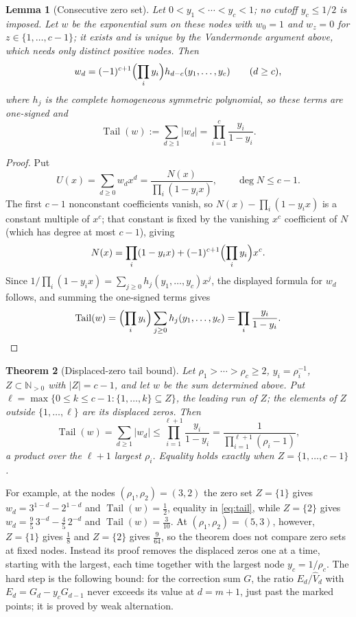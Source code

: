 \documentclass[11pt]{article}
\newtheorem{theorem}{Theorem}[section]
\newtheorem{lemma}[theorem]{Lemma}
\newcommand{\N}{\mathbb N}
\DeclareMathOperator{\Tail}{Tail}
\begin{document}
\begin{lemma}[Consecutive zero set]\label{lem:consecutive}
Let $0<y_1<\cdots<y_c<1$; no cutoff $y_c\le1/2$ is imposed.  Let $w$ be the
exponential sum on these nodes with $w_0=1$ and $w_z=0$ for $z\in\{1,\ldots,c-1\}$;
it exists and is unique by the Vandermonde argument above, which needs only
distinct positive nodes.  Then
\[
  w_d=(-1)^{c+1}\Bigl(\prod_iy_i\Bigr)h_{d-c}(y_1,\ldots,y_c)
  \qquad(d\ge c),
\]
where $h_j$ is the complete homogeneous symmetric polynomial, so these terms
are one-signed and
\[
  \Tail(w):=\sum_{d\ge1}|w_d|=\prod_{i=1}^c\frac{y_i}{1-y_i}.
\]
\end{lemma}

\begin{proof}
Put
\[
  U(x)=\sum_{d\ge0}w_dx^d=\frac{N(x)}{\prod_i(1-y_ix)},
  \qquad \deg N\le c-1.
\]
The first $c-1$ nonconstant coefficients vanish, so $N(x)-\prod_i(1-y_ix)$
is a constant multiple of $x^c$; that constant is fixed by the vanishing
$x^c$ coefficient of $N$ (which has degree at most $c-1$), giving
\[
  N(x)=\prod_i(1-y_ix)+(-1)^{c+1}\Bigl(\prod_i y_i\Bigr)x^c .
\]
Since $1/\prod_i(1-y_ix)=\sum_{j\ge0}h_j(y_1,\ldots,y_c)x^j$, the displayed
formula for $w_d$ follows, and summing the one-signed terms gives
\[
  \Tail(w)=\Bigl(\prod_i y_i\Bigr)\sum_{j\ge0}h_j(y_1,\ldots,y_c)
          =\prod_i\frac{y_i}{1-y_i}.
\]
\end{proof}

\begin{theorem}[Displaced-zero tail bound]\label{thm:tail}
Let $\rho_1>\cdots>\rho_c\ge2$, $y_i=\rho_i^{-1}$, $Z\subset\N_{>0}$ with
$|Z|=c-1$, and let $w$ be the sum determined above.  Put
$\ell=\max\{0\le k\le c-1:\{1,\ldots,k\}\subseteq Z\}$, the leading run of
$Z$; the elements of $Z$ outside $\{1,\ldots,\ell\}$ are its displaced zeros.
Then
\begin{equation}\label{eq:tail}
  \Tail(w)=\sum_{d\ge1}|w_d|
  \le \prod_{i=1}^{\ell+1}\frac{y_i}{1-y_i}
  =\frac{1}{\prod_{i=1}^{\ell+1}(\rho_i-1)},
\end{equation}
a product over the $\ell+1$ largest $\rho_i$.  Equality holds exactly when $Z=\{1,\ldots,c-1\}$.
\end{theorem}

For example, at the nodes $(\rho_1,\rho_2)=(3,2)$ the zero set $Z=\{1\}$
gives $w_d=3^{1-d}-2^{1-d}$ and $\Tail(w)=\frac12$, equality in
\eqref{eq:tail}, while $Z=\{2\}$ gives $w_d=\frac95\,3^{-d}-\frac45\,2^{-d}$
and $\Tail(w)=\frac3{10}$.  At $(\rho_1,\rho_2)=(5,3)$, however, $Z=\{1\}$
gives $\frac18$ and $Z=\{2\}$ gives $\frac9{64}$, so the theorem does not
compare zero sets at fixed nodes.  Instead its proof removes the displaced
zeros one at a time, starting with the largest, each time together with the
largest node $y_c=1/\rho_c$.  The hard step is the following bound: for the
correction sum $G$, the ratio $E_d/\widehat V_d$ with $E_d=G_d-y_cG_{d-1}$
never exceeds its value at $d=m+1$, just past the marked points; it is
proved by weak alternation.
\end{document}
